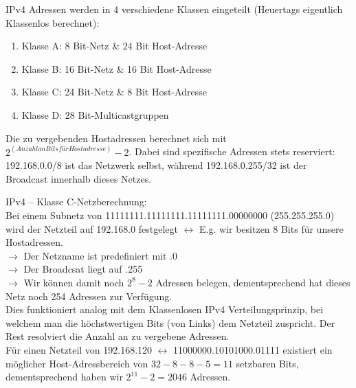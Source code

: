 \documentclass{scrartcl}
\begin{document}
\begin{enumerate}
        IPv4 Adressen werden in 4 verschiedene Klassen eingeteilt (Heuertags eigentlich Klassenlos berechnet):
        \begin{enumerate}
            \item Klasse A: 8 Bit-Netz \& 24 Bit Host-Adresse 
            \item Klasse B: 16 Bit-Netz \& 16 Bit Host-Adresse
            \item Klasse C: 24 Bit-Netz \& 8 Bit Host-Adresse
            \item Klasse D: 28 Bit-Multicastgruppen
    \end{enumerate}
        Die zu vergebenden Hostadressen berechnet sich mit $2^(Anzahl an Bits für Hostadresse) - 2$. Dabei sind spezifische Adressen stets reserviert: 192.168.0.0/8 ist das Netzwerk selbst, während 192.168.0.255/32 ist der Broadcast innerhalb dieses Netzes.
        
        IPv4 -- Klasse C-Netzberechnung:\\
        Bei einem Subnetz von 11111111.11111111.11111111.00000000 (255.255.255.0) wird der Netzteil auf 192.168.0 festgelegt $\leftrightarrow$ E.g. wir besitzen 8 Bits für unsere Hostadressen.\\
        $\rightarrow$ Der Netzname ist predefiniert mit .0\\
        $\rightarrow$ Der Broadcsat liegt auf .255\\
        $\rightarrow$ Wir können damit noch $2^8 - 2$ Adressen belegen, dementsprechend hat dieses Netz noch 254 Adressen zur Verfügung.\\
        
        Dies funktioniert analog mit dem Klassenlosen IPv4 Verteilungsprinzip, bei welchem man die höchstwertigen Bits (von Links) dem Netzteil zuspricht. Der Rest resolviert die Anzahl an zu vergebene Adressen.\\
        Für einen Netzteil von 192.168.120 $\leftrightarrow$ 11000000.10101000.01111 existiert ein möglicher Host-Adressbereich von $32-8-8-5 = 11$ setzbaren Bits, dementsprechend haben wir $2^11 - 2 = 2046$  Adressen. \\
        

\end{enumerate}
\end{document}
